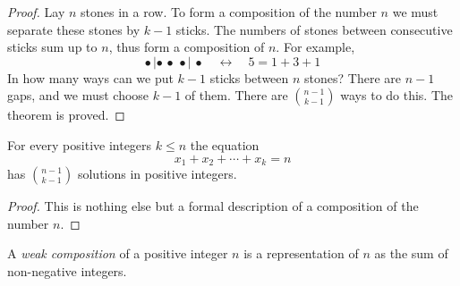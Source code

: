\begin{page}
\setcounter{section}{3}
\setcounter{subsection}{5}
\setcounter{dfn}{10}
\label{portion:93}

\begin{proof}
Lay $n$ stones in a row.
To form a composition of the number $n$ we must separate these stones by $k-1$ sticks.
The numbers of stones between consecutive sticks sum up to $n$, thus form a composition of $n$.
For example,
\[
\bullet\, | \bullet\, \bullet\, \bullet |\, \bullet \quad \longleftrightarrow \quad 5 = 1+3+1
\]
In how many ways can we put $k-1$ sticks between $n$ stones?
There are $n-1$ gaps, and we must choose $k-1$ of them.
There are $\binom{n-1}{k-1}$ ways to do this. The theorem is proved.
\end{proof}


\end{page}

\begin{page}
\setcounter{section}{3}
\setcounter{subsection}{5}
\setcounter{dfn}{11}
\label{portion:95}

\begin{cor}
For every positive integers $k \le n$ the equation
\[
x_1 + x_2 + \cdots + x_k = n
\]
has $\binom{n-1}{k-1}$ solutions in positive integers.
\end{cor}

\end{page}

\begin{page}
\setcounter{section}{3}
\setcounter{subsection}{5}
\setcounter{dfn}{11}
\label{portion:96}

\begin{proof}
This is nothing else but a formal description of a composition of the number $n$.
\end{proof}


\end{page}

\begin{page}
\setcounter{section}{3}
\setcounter{subsection}{5}
\setcounter{dfn}{12}
\label{portion:98}

\begin{dfn}
A \emph{weak composition} of a positive integer $n$ is a representation of $n$ as the sum of non-negative integers.
\end{dfn}

\end{page}

